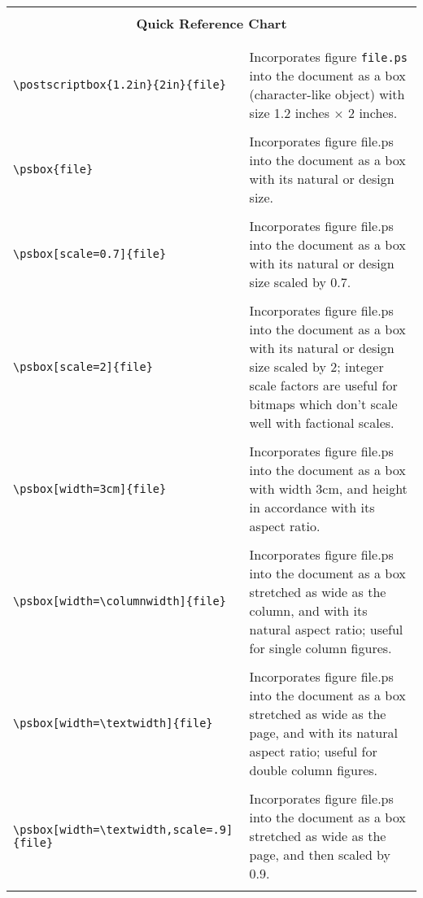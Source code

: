 \begin{table*}[p]
  \begin{center}
    \begin{tabular}{lp{3.5in}}
      \hline
      \\
      \multicolumn{2}{c}{\Large\bf Quick Reference Chart} \\
      \\
      \hline
      \\
      \verb|\postscriptbox{1.2in}{2in}{file}| &
	 Incorporates figure {\tt file.ps} into the document as a box
	(character-like object) with size 1.2 inches $\times$ 2 inches. \\
      \\
      \verb|\psbox{file}| &
	Incorporates figure {file.ps} into the document as a box
	with its natural or design size. \\
      \\
      \verb|\psbox[scale=0.7]{file}| &
	Incorporates figure {file.ps} into the document as a box
	with its natural or design size scaled by 0.7. \\
      \\
      \verb|\psbox[scale=2]{file}| &
	Incorporates figure {file.ps} into the document as a box
	with its natural or design size scaled by 2;
	integer scale factors are useful for bitmaps which don't scale
	well with factional scales. \\
      \\
      \verb|\psbox[width=3cm]{file}| &
	Incorporates figure {file.ps} into the document as a box
	with width 3cm, and height in accordance
	with its aspect ratio. \\
      \\
      \verb|\psbox[width=\columnwidth]{file}| &
	Incorporates figure {file.ps} into the document as a box
	stretched as wide as the column,
	and with its natural aspect ratio;
	useful for single column figures. \\
      \\
      \verb|\psbox[width=\textwidth]{file}| &
	Incorporates figure {file.ps} into the document as a box
	stretched as wide as the page,
	and with its natural aspect ratio;
	useful for double column figures. \\
      \\
      \verb|\psbox[width=\textwidth,scale=.9]{file}| &
	Incorporates figure {file.ps} into the document as a box
	stretched as wide as the page, and then scaled by 0.9. \\
      \\

\end{tabular}
\end{center}
\end{table*}
